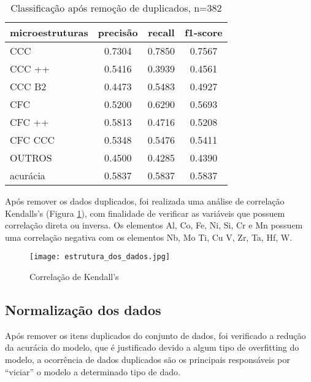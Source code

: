 \pagebreak



\begin{table}[htb]
\centering
\caption{Classificação após remoção de duplicados, n=382}
\begin{supertabular}{l|c|c|c}
\hline
{ microestruturas } & { precisão } & { recall } & { f1-score } \\\hline
{ CCC } &           {0.7304} &  {0.7850} & {0.7567} \\\hline
{ CCC ++ } &        {0.5416} &  {0.3939} & {0.4561} \\\hline
{ CCC B2 } &        {0.4473} &  {0.5483} & {0.4927} \\\hline
{ CFC } &           {0.5200} &  {0.6290} & {0.5693} \\\hline
{ CFC ++ } &        {0.5813} &  {0.4716} & {0.5208} \\\hline
{ CFC CCC } &       {0.5348} &  {0.5476} & {0.5411} \\\hline
{ OUTROS } &         {0.4500} &  {0.4285} & {0.4390} \\\hline
{ acurácia } &      {0.5837} &  {0.5837} & {0.5837} \\\hline
\end{supertabular}
    \legend{}
    \label{table:relatorio_sem_duplicados}
\end{table}



Após remover os dados duplicados, foi realizada uma análise de correlação Kendalls's (Figura \ref{fig:kendals_correlacao_sem_duplicados}), com finalidade de verificar as variáveis que possuem correlação direta ou inversa. Os elementos Al, Co, Fe, Ni, Si, Cr e Mn possuem uma correlação negativa com os elementos Nb, Mo Ti, Cu V, Zr, Ta, Hf, W.


\begin{figure}[ht]
    \centering
    \texttt{[image: estrutura\_dos\_dados.jpg]} 
    \caption{Correlação de Kendall's }
    \label{fig:kendals_correlacao_sem_duplicados}
\end{figure}
\FloatBarrier


\subsection{Normalização dos dados}\label{sec:MAT_MET_SEC_B_SUB_D}

Após remover os itens duplicados do conjunto de dados, foi verificado a redução da acurácia do modelo, que é justificado devido a algum tipo de overfitting do modelo, a ocorrência de dados duplicados são os principais responsáveis por ``viciar'' o modelo a determinado tipo de dado.

